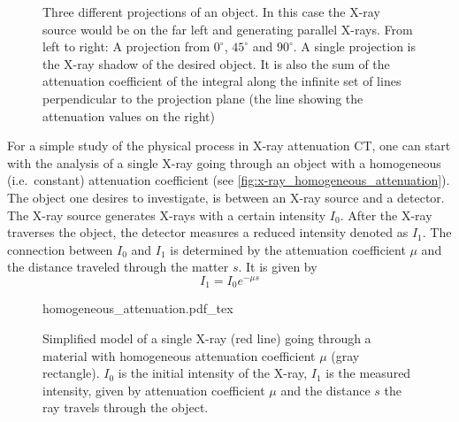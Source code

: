 \begin{figure}
	\centering
	\caption{Three different projections of an object. In this case the X-ray source would be on
		the far left and generating parallel X-rays. From left to right: A projection from
		\(0^\circ\), \(45^\circ\) and \(90^\circ\). A single projection is the X-ray shadow
		of the desired object. It is also the sum of the attenuation coefficient of the
		integral along the infinite set of lines perpendicular to the projection plane (the
		line showing the attenuation values on the right)}\label{fig:sinogram_example_abdomen}
\end{figure}

For a simple study of the physical process in X-ray attenuation CT, one can start with the analysis
of a single X-ray going through an object with a homogeneous (i.e.\ constant) attenuation
coefficient (see \autoref{fig:x-ray_homogeneous_attenuation}). The object one desires to
investigate, is between an X-ray source and a detector. The X-ray source generates X-rays with a
certain intensity \(I_0\). After the X-ray traverses the object, the detector measures a reduced
intensity denoted as \(I_1\). The connection between \(I_0\) and \(I_1\) is determined by the
attenuation coefficient \(\mu\) and the distance traveled through the matter \(s\). It is given by
\[ I_1 = I_0 e^{-\mu s} \]

\begin{figure}
	\centering
	\def\svgwidth{0.75\textwidth}
	{homogeneous_attenuation.pdf_tex}
	\caption{Simplified model of a single X-ray (red line) going through a material with
		homogeneous attenuation coefficient \(\mu\) (gray rectangle). \(I_0\) is the initial
		intensity of the X-ray, \(I_1\) is the measured intensity, given by attenuation
		coefficient \(\mu\) and the distance \(s\) the ray travels through the
		object.}\label{fig:x-ray_homogeneous_attenuation}
\end{figure}


